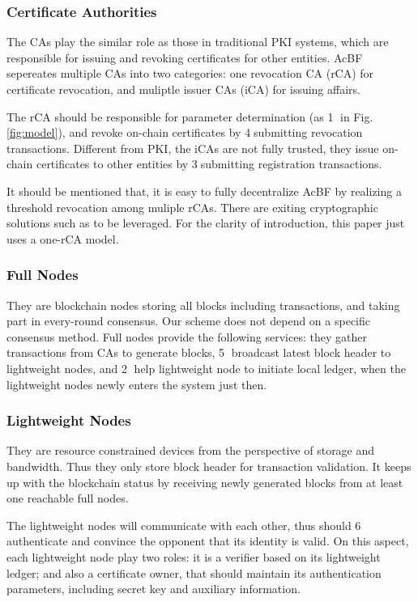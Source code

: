 \documentclass[conference]{IEEEtran}
\begin{document}
\subsubsection{Certificate Authorities}
 The CAs play the similar role as those in traditional PKI systems, which are responsible for issuing and revoking certificates for other entities. AcBF sepereates multiple CAs into two categories: one revocation CA (rCA) for certificate revocation, and muliptle issuer CAs (iCA) for issuing affairs. 
 
 The rCA should be responsible for parameter determination (as \textcircled{1} in Fig. \ref{fig:model}), and revoke on-chain certificates by \textcircled{4}submitting revocation transactions. Different from PKI, the iCAs are not fully trusted, they issue on-chain certificates to other entities by \textcircled{3}submitting registration transactions. 

It should be mentioned that, it is easy to fully decentralize AcBF by realizing a threshold revocation among muliple rCAs. There are exiting cryptographic solutions such as \cite{Gennaro2019FullyDG} to be leveraged. 
For the clarity of introduction, this paper just uses a one-rCA model. 

\subsubsection{Full Nodes}
They are blockchain nodes storing all blocks including transactions, and taking part in every-round consensus. Our scheme does not depend on a specific consensus method. Full nodes provide the following services: they gather transactions from CAs to generate blocks, \textcircled{5} broadcast latest block header to lightweight nodes, and \textcircled{2} help lightweight node to initiate local ledger,  when the lightweight nodes newly enters the system just then. 

\subsubsection{Lightweight Nodes}
They are resource constrained devices from the perspective of storage and bandwidth. Thus they only store block header for transaction validation. 
It keeps up with the blockchain status by receiving newly generated blocks from at least one reachable full nodes. 

The lightweight nodes will communicate with each other, thus should \textcircled{6} authenticate and convince the opponent that its identity is valid. On this aspect, each lightweight node play two roles: it is a verifier based on its lightweight ledger; and also a certificate owner, that should maintain its authentication parameters, including secret key and auxiliary information.
\end{document}
